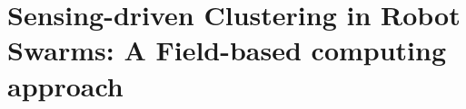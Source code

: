 \newcommand{\LP}[2]{\marginpar{$\color{red}\star$}\color{gray}\sout{#1}\color{blue}\
  #2 \color{black}}
\newcommand{\LPr}[2]{{\color{gray}\ #1\ \color{orange}\  #2}}


\chapter[Sensing-driven Clustering in Robot Swarms]{Sensing-driven Clustering in Robot Swarms: A Field-based computing approach}
\minitoc%


%
%
%

